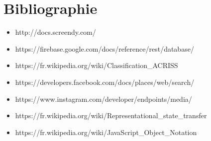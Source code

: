\documentclass[12pt,a4paper]{report}
\begin{document}
	\chapter*{Bibliographie}
	
	\vspace{2cm}
	  \begin{itemize}
	 		\item http://docs.screendy.com/
			\item https://firebase.google.com/docs/reference/rest/database/
			\item https://fr.wikipedia.org/wiki/Classification\_ACRISS
			\item https://developers.facebook.com/docs/places/web/search/
			\item https://www.instagram.com/developer/endpoints/media/
			\item https://fr.wikipedia.org/wiki/Representational\_state\_transfer
			\item https://fr.wikipedia.org/wiki/JavaScript\_Object\_Notation
		\end{itemize}
	
\end{document}
